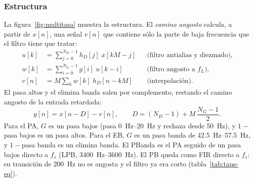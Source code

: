 \documentclass[11pt,a4paper]{article}
\begin{document}
\subsubsection{Estructura}

La figura~\ref{fig:multitasa} muestra la estructura. El \emph{camino
angosto} calcula, a partir de $x[n]$, una señal $v[n]$ que contiene sólo la
parte de baja frecuencia que el filtro tiene que tratar:
\begin{align}
  u[k] &= \sum_{j=0}^{N_D-1} h_D[j]\; x[kM - j]
        && \text{(filtro antialias y diezmado)}, \label{eq:diezmado}\\
  w[k] &= \sum_{i=0}^{N_G-1} g[i]\; u[k-i]
        && \text{(filtro angosto a } f_L\text{)}, \\
  v[n] &= M \sum_{k} w[k]\; h_D[n - kM]
        && \text{(interpolación)}. \label{eq:interpolacion}
\end{align}
El pasa altos y el elimina banda salen por complemento, restando el camino
angosto de la entrada retardada:
\begin{equation}
  y[n] = x[n-D] - v[n], \qquad D = (N_D - 1) + M\,\frac{N_G - 1}{2}.
  \label{eq:complemento}
\end{equation}
Para el PA, $G$ es un pasa bajos (pasa \qtyrange{0}{20}{\hertz} y rechaza
desde \qty{50}{\hertz}), y $1 - {}$pasa bajos es un pasa altos. Para el EB,
$G$ es un pasa banda de \qtyrange{42.5}{57.5}{\hertz}, y $1 - {}$pasa banda
es un elimina banda. El PBanda es el PA seguido de un pasa bajos directo a
$f_s$ (LPB, \qtyrange{3400}{3600}{\hertz}). El PB queda como FIR directo a
$f_s$: su transición de \qty{200}{\hertz} no es angosta y el filtro ya era
corto (tabla~\ref{tab:taps-eq}).
\end{document}
